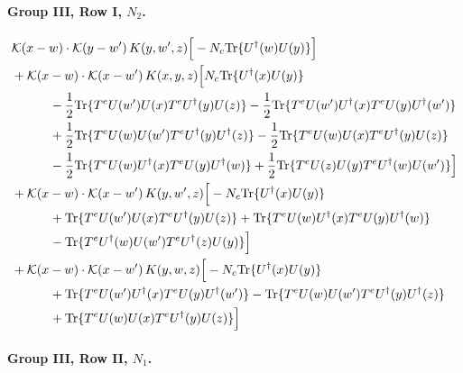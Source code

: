 \documentclass[10pt]{article}
\numberwithin{equation}{section}
\begin{document}
\paragraph{Group III, Row I, $N_2$.}

\begin{align}
&\mathcal K(x-w)\cdot\mathcal K(y-w')\,K(y,w',z)\Big[-N_c{\rm Tr}\{U^\dagger(w)U(y)\}\Big]\notag\\
&+\mathcal K(x-w)\cdot\mathcal K(x-w')\,K(x,y,z)\Big[N_c{\rm Tr}\{U^\dagger(x)U(y)\}\notag\\
&\quad\quad\quad-\frac{1}{2}{\rm Tr}\{T^eU(w')U(x)T^eU^\dagger(y)U(z)\}-\frac{1}{2}{\rm Tr}\{T^eU(w')U^\dagger(x)T^eU(y)U^\dagger(w')\}\notag\\
&\quad\quad\quad+\frac{1}{2}{\rm Tr}\{T^eU(w)U(w')T^eU^\dagger(y)U^\dagger(z)\}-\frac{1}{2}{\rm Tr}\{T^eU(w)U(x)T^eU^\dagger(y)U(z)\}\notag\\
&\quad\quad\quad-\frac{1}{2}{\rm Tr}\{T^eU(w)U^\dagger(x)T^eU(y)U^\dagger(w)\}+\frac{1}{2}{\rm Tr}\{T^eU(z)U(y)T^eU^\dagger(w)U(w')\}\Big]\notag\\
&+\mathcal K(x-w)\cdot\mathcal K(x-w')\,K(y,w',z)\Big[-N_c{\rm Tr}\{U^\dagger(x)U(y)\}\notag\\
&\quad\quad\quad+{\rm Tr}\{T^eU(w')U(x)T^eU^\dagger(y)U(z)\}+{\rm Tr}\{T^eU(w)U^\dagger(x)T^eU(y)U^\dagger(w)\}\notag\\
&\quad\quad\quad-{\rm Tr}\{T^eU^\dagger(w)U(w')T^eU^\dagger(z)U(y)\}\Big]\notag\\
&+\mathcal K(x-w)\cdot\mathcal K(x-w')\,K(y,w,z)\Big[-N_c{\rm Tr}\{U^\dagger(x)U(y)\}\notag\\
&\quad\quad\quad+{\rm Tr}\{T^eU(w')U^\dagger(x)T^eU(y)U^\dagger(w')\}-{\rm Tr}\{T^eU(w)U(w')T^eU^\dagger(y)U^\dagger(z)\}\notag\\
&\quad\quad\quad+{\rm Tr}\{T^eU(w)U(x)T^eU^\dagger(y)U(z)\}\Big]
\label{eq:list15}
\end{align}

\paragraph{Group III, Row II, $N_1$.}
\end{document}
